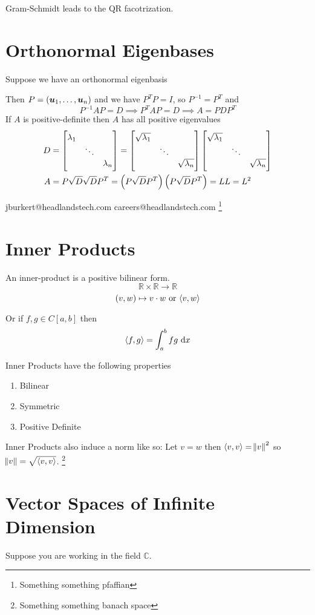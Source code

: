 \documentclass{article}
\DeclarePairedDelimiter\ip{\langle }{\rangle}
\newcommand{\m}[1]{\begin{bmatrix} #1 \end{bmatrix}}
\newcommand{\RR}{\mathbb{R}}
\newcommand{\CC}{\mathbb{C}}
\begin{document}
Gram-Schmidt leads to the QR facotrization.

\section{Orthonormal Eigenbases}

Suppose we have an orthonormal eigenbasis

Then \(P  = \del{\bm u_1, \dots, \bm u_n}\) and we have \(P^TP = I\), so \(P^{-1} = P^T\) and
\[P^{-1}AP = D \implies P^TAP = D \implies A = PDP^T\]
If \(A\) is positive-definite then \(A\) has all positive eigenvalues
\begin{align*}
  D &= \m{\lambda_1 &&\\&\ddots&\\&&\lambda_n} = \m{\sqrt{\lambda_1} &&\\&\ddots&\\&&\sqrt{\lambda_n}}\m{\sqrt{\lambda_1} &&\\&\ddots&\\&&\sqrt{\lambda_n}}\\
 A &= P\sqrt{D}\sqrt{D}P^T = \del{P\sqrt{D}P^T}\del{P\sqrt{D}P^T} = LL = L^2
\end{align*}


jburkert@headlandstech.com careers@headlandstech.com
\footnote{Something something pfaffian}
\section{Inner Products}
An inner-product is a positive bilinear form.
\[\RR \times \RR \to \RR\]
\[(v, w) \mapsto v \cdot w \text{ or \(\ip{v, w}\)}\]

Or if \(f, g \in C[a, b]\) then
\[\ip{f, g} = \int_a^bfg \,\dif x\]

Inner Products have the following properties
\begin{enumerate}
\item Bilinear
\item Symmetric
\item Positive Definite
\end{enumerate}

Inner Products also induce a norm like so:
Let \(v = w\) then \(\ip{v,v} = \norm{v}^2\) so \(\norm{v} = \sqrt{\ip{v, v}}\).
\footnote{Something something banach space}

\section{Vector Spaces of Infinite Dimension}
Suppose you are working in the field \(\CC\).
\end{document}
